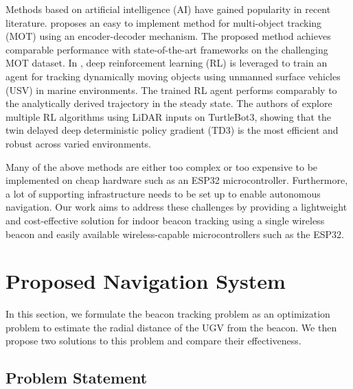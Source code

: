 \documentclass[conference]{IEEEtran}
\begin{document}
Methods based on artificial intelligence (AI) have gained popularity in recent
literature. \cite{liuSimpleOnlineUnmanned2021} proposes an easy to implement
method for multi-object tracking (MOT) using an encoder-decoder mechanism. The
proposed method achieves comparable performance with state-of-the-art frameworks
on the challenging MOT dataset. In \cite{masmitjaReinforcementLearningPath2022},
deep reinforcement learning (RL) is leveraged to train an agent for tracking
dynamically moving objects using unmanned surface vehicles (USV) in marine
environments. The trained RL agent performs comparably to the analytically
derived trajectory in the steady state. The authors of
\cite{kashyapAutonomousNavigationROS22025} explore multiple RL algorithms using
LiDAR inputs on TurtleBot3, showing that the twin delayed deep deterministic
policy gradient (TD3) is the most efficient and robust across varied
environments.

Many of the above methods are either too complex or too expensive to be
implemented on cheap hardware such as an ESP32 microcontroller. Furthermore, a
lot of supporting infrastructure needs to be set up to enable autonomous
navigation. Our work aims to address these challenges by providing a lightweight
and cost-effective solution for indoor beacon tracking using a single wireless
beacon and easily available wireless-capable microcontrollers such as the ESP32.

\section{Proposed Navigation System}
\label{sec:proposed-system}

In this section, we formulate the beacon tracking problem as an optimization
problem to estimate the radial distance of the UGV from the beacon. We then
propose two solutions to this problem and compare their effectiveness.


\subsection{Problem Statement}
\label{subsec:problem-statement}
\end{document}
